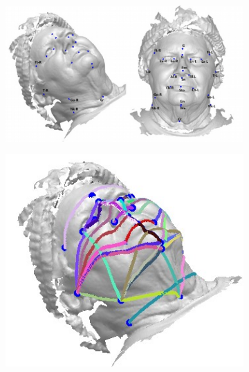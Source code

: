 \begin{figure}[h]
	\centering
	\begin{subfigure}[b]{0.44\textwidth}
		\centering
		\includegraphics[width=\textwidth]{figures/resers_i.png}
		\caption{}
		\label{fig:resers:i}
	\end{subfigure}
	\hfill
	\begin{subfigure}[b]{0.28\textwidth}
		\centering
		\includegraphics[width=\textwidth]{figures/resers_j.png}
		\caption{}
		\label{fig:resers:j}
	\end{subfigure}
	\hfill
	\begin{subfigure}[b]{0.21\textwidth}
		\centering

\end{subfigure}
\end{figure}
